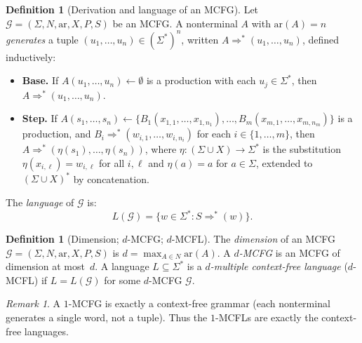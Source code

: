 \documentclass[11pt,a4paper]{article}
\theoremstyle{plain}
\theoremstyle{definition}
\newtheorem{definition}[theorem]{Definition}
\theoremstyle{remark}
\newtheorem{remark}[theorem]{Remark}
\begin{document}
\begin{definition}[Derivation and language of an MCFG]\label{def:mcfg-language}
Let $\mathcal{G} = (\Sigma, N, \mathrm{ar}, X, P, S)$ be an MCFG.
A nonterminal $A$ with $\mathrm{ar}(A) = n$ \emph{generates} a tuple $(u_1, \ldots, u_n) \in (\Sigma^*)^n$, written $A \Rightarrow^* (u_1, \ldots, u_n)$, defined inductively:
\begin{itemize}[nosep]
  \item \textbf{Base.} If $A(u_1, \ldots, u_n) \leftarrow \emptyset$ is a production with each $u_j \in \Sigma^*$, then $A \Rightarrow^* (u_1, \ldots, u_n)$.
  \item \textbf{Step.} If $A(s_1, \ldots, s_n) \leftarrow \{B_1(x_{1,1}, \ldots, x_{1,n_1}), \ldots, B_m(x_{m,1}, \ldots, x_{m,n_m})\}$ is a production, and $B_i \Rightarrow^* (w_{i,1}, \ldots, w_{i,n_i})$ for each $i \in \{1,\ldots,m\}$, then $A \Rightarrow^* (\eta(s_1), \ldots, \eta(s_n))$, where $\eta\colon (\Sigma \cup X) \to \Sigma^*$ is the substitution $\eta(x_{i,\ell}) = w_{i,\ell}$ for all $i,\ell$ and $\eta(a) = a$ for $a \in \Sigma$, extended to $(\Sigma \cup X)^*$ by concatenation.
\end{itemize}
The \emph{language} of $\mathcal{G}$ is:
\[
  L(\mathcal{G}) = \{w \in \Sigma^* : S \Rightarrow^* (w)\}.
\]
\end{definition}

\begin{definition}[Dimension; $d$-MCFG; $d$-MCFL]\label{def:dimension}
The \emph{dimension} of an MCFG $\mathcal{G} = (\Sigma, N, \mathrm{ar}, X, P, S)$ is $d = \max_{A \in N} \mathrm{ar}(A)$.
A \emph{$d$-MCFG} is an MCFG of dimension at most~$d$.
A language $L \subseteq \Sigma^*$ is a \emph{$d$-multiple context-free language} ($d$-MCFL) if $L = L(\mathcal{G})$ for some $d$-MCFG $\mathcal{G}$.
\end{definition}

\begin{remark}\label{rem:mcfg-cfg}
A $1$-MCFG is exactly a context-free grammar (each nonterminal generates a single word, not a tuple).
Thus the $1$-MCFLs are exactly the context-free languages.
\end{remark}
\end{document}

